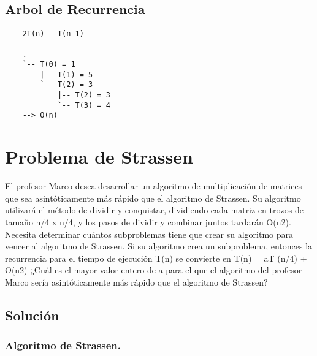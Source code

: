 \documentclass[12pt]{exam}
\begin{document}
\subsection*{Arbol de Recurrencia}
\begin{verbatim}
    2T(n) - T(n-1)

    .
    `-- T(0) = 1
        |-- T(1) = 5
        `-- T(2) = 3
            |-- T(2) = 3 
            `-- T(3) = 4
    --> O(n)
\end{verbatim}

\section*{Problema de Strassen}

El profesor Marco desea desarrollar un algoritmo de multiplicación de matrices
que sea asintóticamente más rápido que el algoritmo de Strassen. Su algoritmo utilizará el
método de dividir y conquistar, dividiendo cada matriz en trozos de tamaño n/4 x n/4, y los
pasos de dividir y combinar juntos tardarán O(n2). Necesita determinar cuántos subproblemas
tiene que crear su algoritmo para vencer al algoritmo de Strassen. Si su algoritmo crea
un subproblema, entonces la recurrencia para el tiempo de ejecución T(n) se convierte en
T(n) = aT (n/4) + O(n2) ¿Cuál es el mayor valor entero de a para el que el algoritmo del
profesor Marco sería asintóticamente más rápido que el algoritmo de Strassen?

\subsection*{Solución}
\subsubsection*{Algoritmo de Strassen.}
\end{document}
